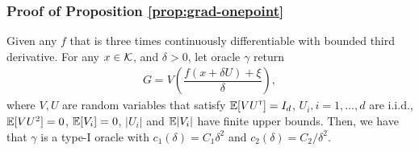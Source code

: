 \subsubsection*{Proof of Proposition \ref{prop:grad-onepoint}}

\begin{proposition}
\label{prop:grad-1spsa}
Given any $f$ that is three times continuously differentiable with bounded third derivative. 
For any $x \in \mathcal{K}$, and $\delta >0$, let oracle $\gamma$ return 
\begin{align}
G =  V \left(\dfrac{f(x+\delta U) + \xi}{\delta}\right),
 \label{eq:onesp}
\end{align}
where $V, U$ are random variables that satisfy $\mathbb{E}[V U^\mathsf{\scriptscriptstyle T}] = I_d$, $U_i, i=1,\ldots,d$ are i.i.d., $\mathbb{E}[ V U^2] = 0$, $\mathbb{E}[V_i]=0$, $|U_i|$ and $\mathbb{E}|V_i|$ have finite upper bounds. 
Then, we have that $\gamma$ is a type-I oracle with $c_1(\delta) = C_1 \delta^2$ and $c_2(\delta) = C_2/\delta^2$.
\end{proposition}
\fi
